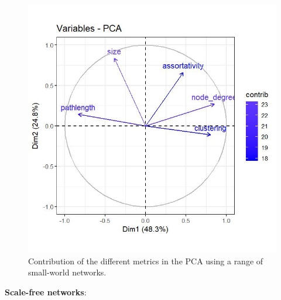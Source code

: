 \documentclass[
]{article}
\begin{document}
\begin{figure}[!H]

{\centering \includegraphics{./Figures/unnamed-chunk-87-1} 

}

\caption{Contribution of the different metrics in the PCA using a range of small-world networks.}\label{fig:unnamed-chunk-87}
\end{figure}

\textbf{Scale-free networks}:
\end{document}
